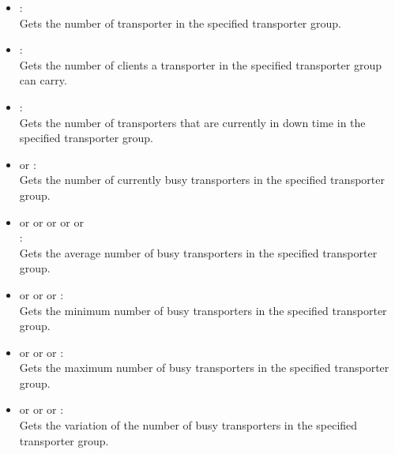 \begin{itemize}
  
\item
{}:\\
Gets the number of transporter in the specified transporter group.

\item
{}:\\
Gets the number of clients a transporter in the specified transporter group can carry.
  
\item
{}:\\
Gets the number of transporters that are currently in down time in the specified transporter group.
  
\item
{} or :\\
Gets the number of currently busy transporters in the specified transporter group.
  
\item
{} or  or  or  or  or\\
:\\
Gets the average number of busy transporters in the specified transporter group.
  
\item
{} or  or  or :\\
Gets the minimum number of busy transporters in the specified transporter group.
  
\item
{} or  or  or :\\
Gets the maximum number of busy transporters in the specified transporter group.
  
\item
{} or  or  or :\\
Gets the variation of the number of busy transporters in the specified transporter group.
  

\end{itemize}
